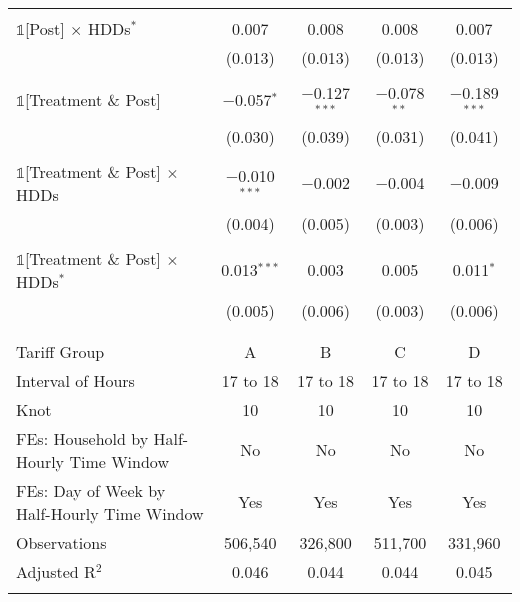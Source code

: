 \begin{table}[!htbp]
\begin{tabular}{@{\extracolsep{30pt}}lcccc}
  & & & & \\ 
 $\mathbb{1}$[Post] $\times$ HDDs$^{*}$ & 0.007 & 0.008 & 0.008 & 0.007 \\ 
  & (0.013) & (0.013) & (0.013) & (0.013) \\ 
  & & & & \\ 
 $\mathbb{1}$[Treatment \& Post] & $-$0.057$^{*}$ & $-$0.127$^{***}$ & $-$0.078$^{**}$ & $-$0.189$^{***}$ \\ 
  & (0.030) & (0.039) & (0.031) & (0.041) \\ 
  & & & & \\ 
 $\mathbb{1}$[Treatment \& Post] $\times$ HDDs & $-$0.010$^{***}$ & $-$0.002 & $-$0.004 & $-$0.009 \\ 
  & (0.004) & (0.005) & (0.003) & (0.006) \\ 
  & & & & \\ 
 $\mathbb{1}$[Treatment \& Post] $\times$ HDDs$^{*}$ & 0.013$^{***}$ & 0.003 & 0.005 & 0.011$^{*}$ \\ 
  & (0.005) & (0.006) & (0.003) & (0.006) \\ 
  & & & & \\ 
\hline \\[-1.8ex] 
Tariff Group & A & B & C & D \\ 
Interval of Hours & 17 to 18 & 17 to 18 & 17 to 18 & 17 to 18 \\ 
Knot & 10 & 10 & 10 & 10 \\ 
FEs: Household by Half-Hourly Time Window & No & No & No & No \\ 
FEs: Day of Week by Half-Hourly Time Window & Yes & Yes & Yes & Yes \\ 
Observations & 506,540 & 326,800 & 511,700 & 331,960 \\ 
Adjusted R$^{2}$ & 0.046 & 0.044 & 0.044 & 0.045 \\ 
\hline 
\hline \\[-1.8ex] 
\end{tabular} 
\end{table} 
